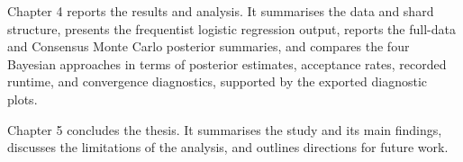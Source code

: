 Chapter 4 reports the results and analysis. It summarises the data and shard structure, presents the frequentist logistic regression output, reports the full-data and Consensus Monte Carlo posterior summaries, and compares the four Bayesian approaches in terms of posterior estimates, acceptance rates, recorded runtime, and convergence diagnostics, supported by the exported diagnostic plots.

Chapter 5 concludes the thesis. It summarises the study and its main findings, discusses the limitations of the analysis, and outlines directions for future work.

